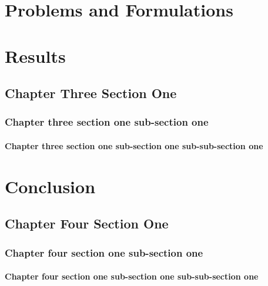 \chapter{Problems and Formulations}

\chapter{Results}
\section{Chapter Three Section One}
\subsection{Chapter three section one sub-section one}
\subsubsection{Chapter three section one sub-section one sub-sub-section one}


\chapter{Conclusion}
\section{Chapter Four Section One}
\subsection{Chapter four section one sub-section one}
\subsubsection{Chapter four section one sub-section one sub-sub-section one}


